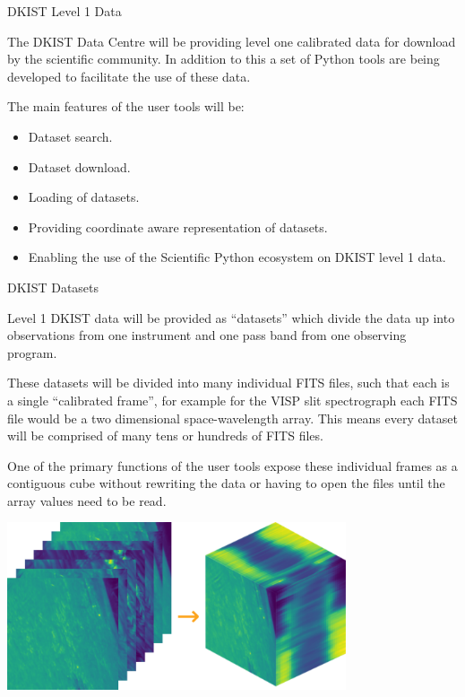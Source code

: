 \documentclass[landscape,a0paper,fontscale=0.32]{baposter}
\begin{document}
\begin{poster}
 
\begin{posterbox}[name=intro,column=0,row=0,span=2]{DKIST Level 1 Data}

  The DKIST Data Centre will be providing level one calibrated data for download
  by the scientific community. In addition to this a set of Python tools are
  being developed to facilitate the use of these data.

  The main features of the user tools will be:
  \begin{itemize}
  \item Dataset search.
  \item Dataset download.
  \item Loading of datasets.
  \item Providing coordinate aware representation of datasets.
  \item Enabling the use of the Scientific Python ecosystem on DKIST level 1
    data.
  \end{itemize}

  
\end{posterbox}

\begin{posterbox}[name=dataset,column=0,row=0,span=1,below=intro]{DKIST Datasets}

  Level 1 DKIST data will be provided as ``datasets'' which divide the data up
  into observations from one instrument and one pass band from one observing
  program.

  These datasets will be divided into many individual FITS files, such that each
  is a single ``calibrated frame'', for example for the VISP slit spectrograph
  each FITS file would be a two dimensional space-wavelength array. This means
  every dataset will be comprised of many tens or hundreds of FITS files.

  One of the primary functions of the user tools expose these individual frames
  as a contiguous cube without rewriting the data or having to open the files
  until the array values need to be read.\\
  
  \begin{center}
    \includegraphics[width=0.75\textwidth]{sequence_and_cube.png}\\[0.4em]
  \end{center}


\end{posterbox}
\end{poster}
\end{document}
